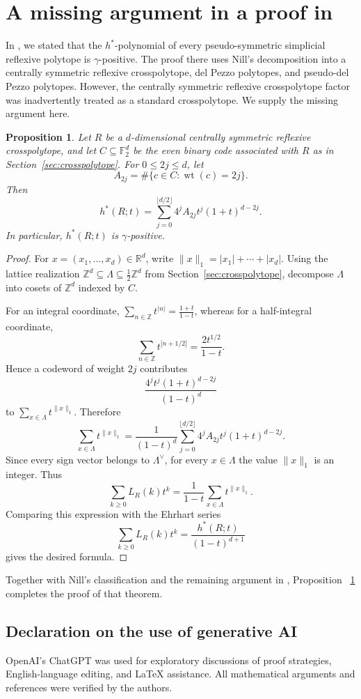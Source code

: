 \documentclass[10pt,a4paper]{amsart}
\newtheorem{Proposition}[Theorem]{Proposition}
\theoremstyle{definition}
\newcommand{\ZZ}{\mathbb Z}
\newcommand{\RR}{\mathbb R}
\begin{document}
\section{A missing argument in a proof in  \cite{OhsugiTsuchiyaLocally}}
\label{app:previous-proof}

In \cite[Theorem~5.8]{OhsugiTsuchiyaLocally}, we stated that the
$h^*$-polynomial of every pseudo-symmetric simplicial reflexive polytope
is $\gamma$-positive.
The proof there uses Nill's decomposition into a centrally symmetric
reflexive crosspolytope, del Pezzo polytopes, and pseudo-del Pezzo
polytopes.
However, the centrally symmetric reflexive crosspolytope factor was
inadvertently treated as a standard crosspolytope.
We supply the missing argument here.

\begin{Proposition}\label{prop:crosspolytope-gamma}
Let $R$ be a $d$-dimensional centrally symmetric reflexive
crosspolytope, and let $C\subseteq\mathbb F_2^d$ be the even binary
code associated with $R$ as in Section~\ref{sec:crosspolytope}.
For $0\le2j\le d$, let
\[
A_{2j}
=
\#\{c\in C:\operatorname{wt}(c)=2j\}.
\]
Then
\[
h^*(R;t)
=
\sum_{j=0}^{\lfloor d/2\rfloor}
4^jA_{2j}t^j(1+t)^{d-2j}.
\]
In particular, $h^*(R;t)$ is $\gamma$-positive.
\end{Proposition}
\begin{proof}
For $x=(x_1,\ldots,x_d)\in\RR^d$, write
$\|x\|_1=|x_1|+\cdots+|x_d|$.
Using the lattice realization
$\ZZ^d\subseteq\Lambda\subseteq\frac12\ZZ^d$
from Section~\ref{sec:crosspolytope}, decompose $\Lambda$ into cosets
of $\ZZ^d$ indexed by $C$.

For an integral coordinate,
$\sum_{n\in\ZZ}t^{|n|}
=
\frac{1+t}{1-t}$,
whereas for a half-integral coordinate,
\[
\sum_{n\in\ZZ}t^{|n+1/2|}
=
\frac{2t^{1/2}}{1-t}.
\]
Hence a codeword of weight $2j$ contributes
\[
\frac{4^jt^j(1+t)^{d-2j}}{(1-t)^d}
\]
to
$\sum_{x\in\Lambda}t^{\|x\|_1}$.
Therefore
\[
\sum_{x\in\Lambda}t^{\|x\|_1}
=
\frac{1}{(1-t)^d}
\sum_{j=0}^{\lfloor d/2\rfloor}
4^jA_{2j}t^j(1+t)^{d-2j}.
\]
Since every sign vector belongs to $\Lambda^\vee$, for every
$x\in\Lambda$ the value $\|x\|_1$ is an integer.
Thus
\[
\sum_{k\ge0}L_R(k)t^k
=
\frac{1}{1-t}
\sum_{x\in\Lambda}t^{\|x\|_1}.
\]
Comparing this expression with the Ehrhart series
\[
\sum_{k\ge0}L_R(k)t^k
=
\frac{h^*(R;t)}{(1-t)^{d+1}}
\]
gives the desired formula.
\end{proof}

Together with Nill's classification and the remaining argument in
\cite[Theorem~5.8]{OhsugiTsuchiyaLocally}, Proposition~
\ref{prop:crosspolytope-gamma} completes the proof of that theorem.

\subsection*{Declaration on the use of generative AI}
OpenAI's ChatGPT was used for exploratory discussions of proof
strategies, English-language editing, and \LaTeX{} assistance.
All mathematical arguments and references were verified by the authors.





\end{document}
